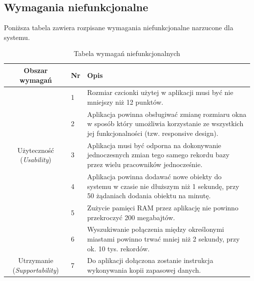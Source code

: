 \documentclass[10pt,a4paper]{article}
\begin{document}
\subsection{Wymagania niefunkcjonalne}
Poniższa tabela zawiera rozpisane wymagania niefunkcjonalne narzucone dla systemu.
\begin{table}[H]
	\begin{tabularx}{\textwidth}{|c|l|X|}
		\hline
		\textbf{Obszar wymagań} & \textbf{Nr} & \textbf{Opis} \\
		\hline
		\multirow{5}{*}{Użyteczność (\textit{Usability})}
		& 1 & Rozmiar czcionki użytej w aplikacji musi być nie mniejszy niż 12 punktów. \\
		\cline{2-3}
		& 2 & Aplikacja powinna obsługiwać zmianę rozmiaru okna w sposób który umożliwia korzystanie ze wszystkich jej funkcjonalności (tzw. responsive design). \\
		\hline
		\multirow{3}{*}{Niezawodność (\textit{Reliability})}
		& 3 & Aplikacja musi być odporna na dokonywanie jednoczesnych zmian tego samego rekordu bazy przez wielu pracowników jednocześnie. \\
		\hline
		\multirow{7}{*}{Wydajność (\textit{Performance})}
		& 4 & Aplikacja powinna dodawać nowe obiekty do systemu w czasie nie dłuższym niż 1 sekundę, przy 50 żądaniach dodania obiektu na minutę. \\
		\cline{2-3}
		& 5 & Zużycie pamięci RAM przez aplikację nie powinno przekroczyć 200 megabajtów. \\
		\cline{2-3}
		& 6 & Wyszukiwanie połączenia między określonymi miastami powinno trwać mniej niż 2 sekundy, przy ok. 10 tys. rekordów. \\
		\hline
		\multirow{2}{*}{Utrzymanie (\textit{Supportability})}
		& 7 & Do aplikacji dołączona zostanie instrukcja wykonywania kopii zapasowej danych. \\
		\hline
	\end{tabularx}
	\caption{Tabela wymagań niefunkcjonalnych}
\end{table}
\end{document}
